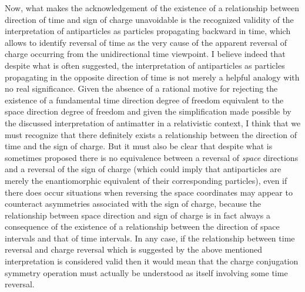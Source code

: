 \documentclass[notitlepage,12pt]{report}
\begin{document}
Now, what makes the acknowledgement of the existence of a relationship between direction of time and sign of charge unavoidable is the recognized validity of the interpretation of antiparticles as particles propagating backward in time, which allows to identify reversal of time as the very cause of the apparent reversal of charge occurring from the unidirectional time viewpoint. I believe indeed that despite what is often suggested, the interpretation of antiparticles as particles propagating in the opposite direction of time is not merely a helpful analogy with no real significance. Given the absence of a rational motive for rejecting the existence of a fundamental time direction degree of freedom equivalent to the space direction degree of freedom and given the simplification made possible by the discussed interpretation of antimatter in a relativistic context, I think that we must recognize that there definitely exists a relationship between the direction of time and the sign of charge. But it must also be clear that despite what is sometimes proposed there is no equivalence between a reversal of \textit{space} directions and a reversal of the sign of charge (which could imply that antiparticles are merely the enantiomorphic equivalent of their corresponding particles), even if there does occur situations when reversing the space coordinates may appear to counteract asymmetries associated with the sign of charge, because the relationship between space direction and sign of charge is in fact always a consequence of the existence of a relationship between the direction of space intervals and that of time intervals. In any case, if the relationship between time reversal and charge reversal which is suggested by the above mentioned interpretation is considered valid then it would mean that the charge conjugation symmetry operation must actually be understood as itself involving some time reversal.
\end{document}
